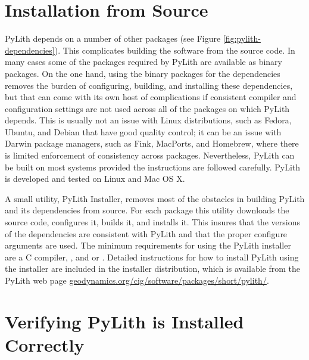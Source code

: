 \section{Installation from Source}

PyLith depends on a number of other packages (see Figure
\vref{fig:pylith-dependencies}).  This complicates building the
software from the source code. In many cases some of the packages
required by PyLith are available as binary packages. On the one hand,
using the binary packages for the dependencies removes the burden of
configuring, building, and installing these dependencies, but that can
come with its own host of complications if consistent compiler and
configuration settings are not used across all of the packages on
which PyLith depends. This is usually not an issue with Linux
distributions, such as Fedora, Ubuntu, and Debian that have good
quality control; it can be an issue with Darwin package managers, such
as Fink, MacPorts, and Homebrew, where there is limited enforcement of
consistency across packages. Nevertheless, PyLith can be built on most
systems provided the instructions are followed carefully. PyLith is
developed and tested on Linux and Mac OS X.

A small utility, PyLith Installer, removes most of the obstacles in
building PyLith and its dependencies from source. For each package
this utility downloads the source code, configures it, builds it, and
installs it. This insures that the versions of the dependencies are
consistent with PyLith and that the proper configure arguments are
used. The minimum requirements for using the PyLith installer are a C
compiler, , and  or .
Detailed instructions for how to install PyLith using the installer
are included in the installer distribution, which is available from
the PyLith web page
\url{geodynamics.org/cig/software/packages/short/pylith/}.


\section{Verifying PyLith is Installed Correctly}

